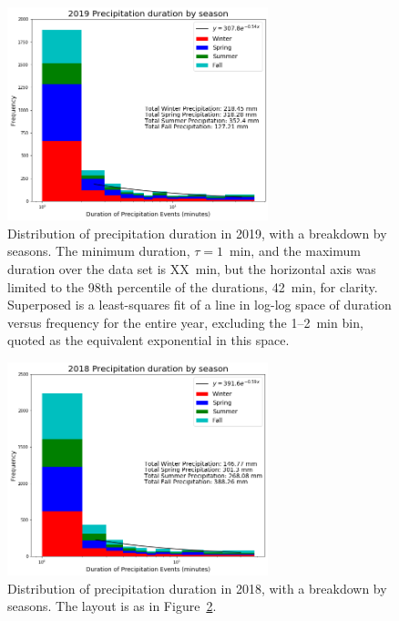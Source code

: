 \documentclass[11pt]{report}
\begin{document}
\begin{figure}[t]
  \centering
  \includegraphics[width=0.675\textwidth]{Figures/More_detail_precip_2019.png}
  \caption[Precipitation histogram for 2019 broken down by season]{\label{p2019}
    Distribution of precipitation duration in 2019, with a breakdown
    by seasons. The minimum duration, $\tau=1$~min, and the maximum
    duration over the data set is XX~min, but the horizontal axis was
    limited to the 98th percentile of the durations, 42~min, for
    clarity. Superposed is a least-squares fit of a line in log-log
    space of duration versus frequency for the entire year, excluding
    the 1--2~min bin, quoted as the equivalent exponential in this
    space.}
\end{figure}
\begin{figure}[b]
  \centering
  \includegraphics[width=0.675\textwidth]{Figures/precip_2018.png}
  \caption[Precipitation histogram for 2018 broken down by season]{\label{p2018}
    Distribution of precipitation duration in 2018, with a breakdown
    by seasons. The layout is as in Figure~\ref{p2018}.}
\end{figure}
	
\end{document}
